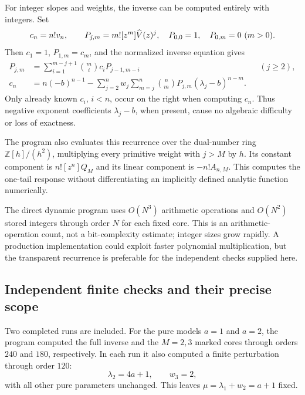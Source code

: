 \documentclass[11pt,a4paper]{article}
\numberwithin{equation}{section}
\theoremstyle{definition}
\theoremstyle{remark}
\begin{document}
For integer slopes and weights, the inverse can be computed entirely with
integers. Set
\[
 c_n=n!v_n,\qquad P_{j,m}=m![z^m]\widehat V(z)^j,
 \quad P_{0,0}=1,\quad P_{0,m}=0\ (m>0).
\]
Then $c_1=1$, $P_{1,m}=c_m$, and the normalized inverse equation gives
\begin{align}
 P_{j,m}&=\sum_{i=1}^{m-j+1}\binom mi c_iP_{j-1,m-i}
                         &&(j\ge2),\label{eq:power-recursion}\\
 c_n&=n(-b)^{n-1}
 -\sum_{j=2}^n w_j\sum_{m=j}^n
          \binom nm P_{j,m}(\lambda_j-b)^{n-m}.
 \label{eq:integer-inverse}
\end{align}
Only already known $c_i$, $i<n$, occur on the right when computing $c_n$.
Thus negative exponent coefficients $\lambda_j-b$, when present, cause no
algebraic difficulty or loss of exactness.

The program also evaluates this recurrence over the dual-number ring
$\mathbb Z[h]/(h^2)$, multiplying every primitive weight with $j>M$ by
$h$. Its constant component is $n![z^n]Q_M$ and its linear component is
$-n!A_{n,M}$. This computes the one-tail response without differentiating
an implicitly defined analytic function numerically.

The direct dynamic program uses $O(N^3)$ arithmetic operations and
$O(N^2)$ stored integers through order $N$ for each fixed core. This is
an arithmetic-operation count, not a bit-complexity estimate; integer sizes
grow rapidly. A production implementation could exploit faster polynomial
multiplication, but the transparent recurrence is preferable for the
independent checks supplied here.

\subsection{Independent finite checks and their precise scope}

Two completed runs are included. For the pure models $a=1$ and $a=2$,
the program computed the full inverse and the $M=2,3$ marked cores through
orders $240$ and $180$, respectively. In each run it also computed a finite
perturbation through order $120$:
\[
 \lambda_2=4a+1,\qquad w_3=2,
\]
with all other pure parameters unchanged. This leaves
$\mu=\lambda_1+w_2=a+1$ fixed.
\end{document}
